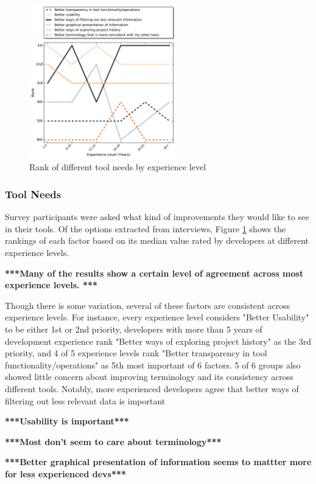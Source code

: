\documentclass[conference]{IEEEtran}
\begin{document}
\begin{figure}[!t]
\centering
\includegraphics[width=2.5in]{ExpVsRankToolNeeds.pdf}
\caption{Rank of different tool needs by experience level}
\label{tool_needs_rank}
\end{figure}

\subsubsection{Tool Needs}
Survey participants were asked what kind of improvements they would like to see in their tools. Of the options extracted from interviews, Figure \ref{tool_needs_rank} shows the rankings of each factor based on its median value rated by developers at different experience levels.

\textbf{***Many of the results show a certain level of agreement across most experience levels. ***}

Though there is some variation, several of these factors are consistent across experience levels. For instance, every experience level considers "Better Usability" to be either 1st or 2nd priority, developers with more than 5 years of development experience rank "Better ways of exploring project history" as the 3rd priority, and 4 of 5 experience levels rank "Better transparency in tool functionality/operations" as 5th most important of 6 factors. 5 of 6 groups also showed little concern about improving terminology and its consistency across different tools.
Notably, more experienced developers agree that better ways of filtering out less relevant data is important

\textbf{***Usability is important***}

\textbf{***Most don't seem to care about terminology***}

\textbf{***Better graphical presentation  of information seems to mattter more for less experienced devs***}
\end{document}
